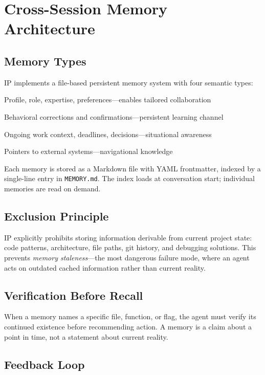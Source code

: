 \documentclass[11pt,twocolumn]{article}
\begin{document}
\section{Cross-Session Memory Architecture}
\label{sec:memory}

\subsection{Memory Types}

IP implements a file-based persistent memory system with four semantic types:

\begin{description}[nosep]
    \item[user] Profile, role, expertise, preferences---enables tailored collaboration
    \item[feedback] Behavioral corrections and confirmations---persistent learning channel
    \item[project] Ongoing work context, deadlines, decisions---situational awareness
    \item[reference] Pointers to external systems---navigational knowledge
\end{description}

Each memory is stored as a Markdown file with YAML frontmatter, indexed by a single-line entry in \texttt{MEMORY.md}. The index loads at conversation start; individual memories are read on demand.

\subsection{Exclusion Principle}

IP explicitly prohibits storing information derivable from current project state: code patterns, architecture, file paths, git history, and debugging solutions. This prevents \emph{memory staleness}---the most dangerous failure mode, where an agent acts on outdated cached information rather than current reality.

\subsection{Verification Before Recall}

When a memory names a specific file, function, or flag, the agent must verify its continued existence before recommending action. A memory is a claim about a point in time, not a statement about current reality.

\subsection{Feedback Loop}
\end{document}
